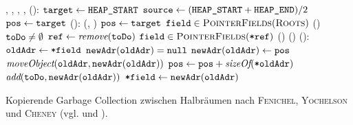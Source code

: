 \begin{algorithm}[h]
\begin{algorithmic}[1]
	\Global {}, , , , 
	\State {}():
	\State \quad $\texttt{target} \gets \texttt{HEAP\_START}$		
	\State \quad $\texttt{source} \gets (\texttt{HEAP\_START} + \texttt{HEAP\_END}) / 2$		
	\State \quad $\texttt{pos} \gets \texttt{target}$		
	\Statex
	\State \Atomic {}():
	\State \quad {}(, )		
	\State \quad $\texttt{pos} \gets \texttt{target}$
	\State \quad \FOREACH $\texttt{field} \in \textsc{PointerFields}(\textsc{Roots})$		
	\State \quad \quad {}()		
	\State \quad \WHILE $\texttt{toDo} \neq \emptyset$		
	\State \quad \quad $\texttt{ref} \gets \textit{remove}(\texttt{toDo})$	
	\State \quad \quad \FOREACH $\texttt{field} \in \textsc{PointerFields}(\texttt{*ref})$
	\State \quad \quad \quad {}()	
	\State \quad {}()
	\Statex
	\State {}():
	\State \quad $\texttt{oldAdr} \gets \texttt{*field}$		
	\State \quad \IF $\texttt{newAdr}(\texttt{oldAdr}) = \texttt{null}$	
	\State \quad \quad $\texttt{newAdr}(\texttt{oldAdr}) \gets \texttt{pos}$		
	\State \quad \quad $\textit{moveObject}(\texttt{oldAdr}, \texttt{newAdr}(\texttt{oldAdr}))$
	\State \quad \quad $\texttt{pos} \gets \texttt{pos} + \textit{sizeOf}(\texttt{*oldAdr})$	
	\State \quad \quad $\textit{add}(\texttt{toDo}, \texttt{newAdr}(\texttt{oldAdr}))$	
	\State \quad $\texttt{*field} \gets \texttt{newAdr}(\texttt{oldAdr})$	
\end{algorithmic}
\caption[Kopierende Garbage Collection nach \textsc{Fenichel}, \textsc{Yochelson} und \textsc{Cheney}]{Kopierende Garbage Collection zwischen Halbräumen nach \textsc{Fenichel}, \textsc{Yochelson} und \textsc{Cheney} (vgl. \cite{fenichel1969} und \cite{cheney1970}).}
\label{algo:copying-gc}
\end{algorithm}

